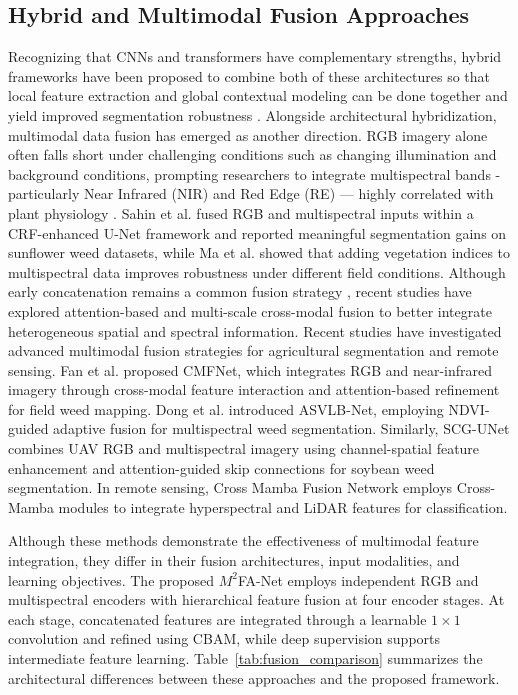 \documentclass[pdflatex,sn-mathphys-num]{sn-jnl}
\begin{document}
\subsection{Hybrid and Multimodal Fusion Approaches}
Recognizing that CNNs and transformers have complementary strengths, hybrid frameworks have been proposed to combine both of these architectures so that local feature extraction and global contextual modeling can be done together and yield improved segmentation robustness \cite{zhou2018unet++}. Alongside architectural hybridization, multimodal data fusion has emerged as another direction. RGB imagery alone often falls short under challenging conditions such as changing illumination and background conditions, prompting researchers to integrate multispectral bands - particularly Near Infrared (NIR) and Red Edge (RE) — highly correlated with plant physiology \cite{zhang2021multispectral}. Sahin et al. \cite{sahin2023segmentation} fused RGB and multispectral inputs within a CRF-enhanced U-Net framework and reported meaningful segmentation gains on sunflower weed datasets, while Ma et al. \cite{ma2024vegetation_dl} showed that adding vegetation indices to multispectral data improves robustness under different field conditions. Although early concatenation remains a common
fusion strategy \cite{li2022attention_agriculture,
yang2025rshrnet}, recent studies have explored
attention-based and multi-scale cross-modal fusion
to better integrate heterogeneous spatial and
spectral information. 
Recent studies have investigated advanced multimodal
fusion strategies for agricultural segmentation and
remote sensing. Fan et al. \cite{fan2024cmfnet} proposed CMFNet,
which integrates RGB and near-infrared imagery through
cross-modal feature interaction and attention-based
refinement for field weed mapping. Dong et al. \cite{dong2026asvlb}
introduced ASVLB-Net, employing NDVI-guided adaptive
fusion for multispectral weed segmentation. Similarly,
SCG-UNet\cite{li2026scgunet} combines UAV RGB and multispectral
imagery using channel-spatial feature enhancement and
attention-guided skip connections for soybean weed
segmentation. In remote sensing, Cross Mamba Fusion
Network\cite{cmfnet2025mamba} employs Cross-Mamba modules to integrate
hyperspectral and LiDAR features for classification.

Although these methods demonstrate the effectiveness
of multimodal feature integration, they differ in
their fusion architectures, input modalities, and
learning objectives. The proposed $M^2$FA-Net
employs independent RGB and multispectral encoders
with hierarchical feature fusion at four encoder
stages. At each stage, concatenated features are
integrated through a learnable $1\times1$ convolution
and refined using CBAM, while deep supervision
supports intermediate feature learning.
Table~\ref{tab:fusion_comparison} summarizes the
architectural differences between these approaches
and the proposed framework.
\end{document}
